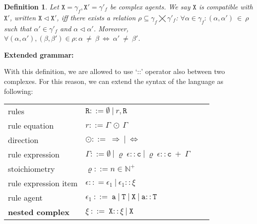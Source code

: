 \documentclass[12pt]{article}
\newtheorem{mydef}{Definition}
\newcommand{\mysmallsection}[1]{\vspace{0.5cm}\large\textbf{#1}\normalsize\vspace{0.5cm}}
\begin{document}
\begin{mydef}
Let $\mathtt{X} = \gamma_f, \mathtt{X}' = \gamma'_f$ be complex agents. We say $\mathtt{X}$ \emph{is compatible with} $\mathtt{X}'$, written $\mathtt{X} \lhd \mathtt{X}'$, iff there exists a relation $\rho \subseteq \gamma_f \bigtimes \gamma'_f $: $\forall \alpha \in \gamma_f: (\alpha, \alpha')~\in~\rho$ such that $\alpha' \in \gamma'_f$ and $\alpha \lhd \alpha'$. Moreover, $\forall (\alpha, \alpha'), (\beta, \beta') \in \rho: \alpha~\neq~\beta~\Leftrightarrow~\alpha'~\neq~\beta' $.
\end{mydef}

\mysmallsection{Extended grammar:}

With this definition, we are allowed to use `::' operator also between two complexes. For this reason, we can extend the syntax of the language as following:

\begin{center}
{\small
\hspace*{-1cm}\begin{tabular}{ ll ll }
 rules& $\mathtt{R} ::= \emptyset ~|~ r, \mathtt{R} $\\
 rule equation & $r ::= \Gamma ~\odot~\Gamma$\\
 direction & $\odot ::=~ \Rightarrow~|~\Leftrightarrow $\\
 rule expression & $\Gamma ::= \emptyset~|~\varrho~\epsilon::\mathtt{c}~|~ \varrho~\epsilon::\mathtt{c}~ +~\Gamma$\\
 stoichiometry & $\varrho ::= n \in \mathbb{N}^+$\\
 rule expression item & $\epsilon :: = \epsilon_1~|~\epsilon_1::\xi$\\
 rule agent & $\epsilon_1  ~::=~  \mathtt{a}~|~\mathtt{T}~|~\mathtt{X}~|~\mathtt{a}::\mathtt{T}$\\
 \textbf{nested complex} & $\xi  ~::=~  \mathtt{X}::\xi~|~\mathtt{X}$
\end{tabular}
}
\end{center}
\end{document}
